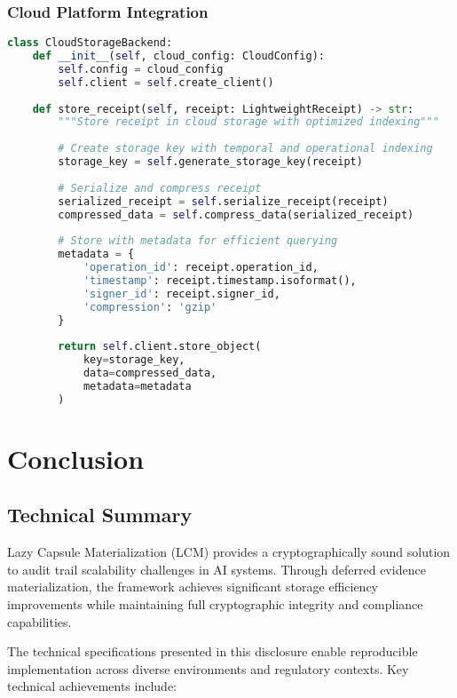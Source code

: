 \documentclass[12pt,a4paper]{article}
\begin{document}
\subsubsection{Cloud Platform Integration}

\begin{lstlisting}[language=Python, caption=Cloud Storage Integration]
class CloudStorageBackend:
    def __init__(self, cloud_config: CloudConfig):
        self.config = cloud_config
        self.client = self.create_client()
    
    def store_receipt(self, receipt: LightweightReceipt) -> str:
        """Store receipt in cloud storage with optimized indexing"""
        
        # Create storage key with temporal and operational indexing
        storage_key = self.generate_storage_key(receipt)
        
        # Serialize and compress receipt
        serialized_receipt = self.serialize_receipt(receipt)
        compressed_data = self.compress_data(serialized_receipt)
        
        # Store with metadata for efficient querying
        metadata = {
            'operation_id': receipt.operation_id,
            'timestamp': receipt.timestamp.isoformat(),
            'signer_id': receipt.signer_id,
            'compression': 'gzip'
        }
        
        return self.client.store_object(
            key=storage_key,
            data=compressed_data,
            metadata=metadata
        )
\end{lstlisting}

\section{Conclusion}

\subsection{Technical Summary}

Lazy Capsule Materialization (LCM) provides a cryptographically sound solution to audit trail scalability challenges in AI systems. Through deferred evidence materialization, the framework achieves significant storage efficiency improvements while maintaining full cryptographic integrity and compliance capabilities.

The technical specifications presented in this disclosure enable reproducible implementation across diverse environments and regulatory contexts. Key technical achievements include:
\end{document}
